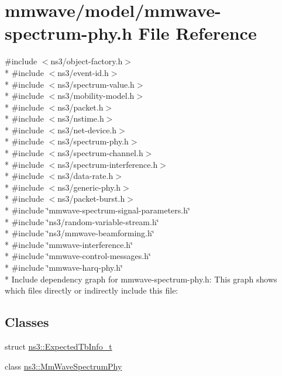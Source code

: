 \hypertarget{mmwave-spectrum-phy_8h}{}\section{mmwave/model/mmwave-\/spectrum-\/phy.h File Reference}
\label{mmwave-spectrum-phy_8h}
{\ttfamily \#include $<$ns3/object-\/factory.\+h$>$}\\*
{\ttfamily \#include $<$ns3/event-\/id.\+h$>$}\\*
{\ttfamily \#include $<$ns3/spectrum-\/value.\+h$>$}\\*
{\ttfamily \#include $<$ns3/mobility-\/model.\+h$>$}\\*
{\ttfamily \#include $<$ns3/packet.\+h$>$}\\*
{\ttfamily \#include $<$ns3/nstime.\+h$>$}\\*
{\ttfamily \#include $<$ns3/net-\/device.\+h$>$}\\*
{\ttfamily \#include $<$ns3/spectrum-\/phy.\+h$>$}\\*
{\ttfamily \#include $<$ns3/spectrum-\/channel.\+h$>$}\\*
{\ttfamily \#include $<$ns3/spectrum-\/interference.\+h$>$}\\*
{\ttfamily \#include $<$ns3/data-\/rate.\+h$>$}\\*
{\ttfamily \#include $<$ns3/generic-\/phy.\+h$>$}\\*
{\ttfamily \#include $<$ns3/packet-\/burst.\+h$>$}\\*
{\ttfamily \#include \char`\"{}mmwave-\/spectrum-\/signal-\/parameters.\+h\char`\"{}}\\*
{\ttfamily \#include \char`\"{}ns3/random-\/variable-\/stream.\+h\char`\"{}}\\*
{\ttfamily \#include \char`\"{}ns3/mmwave-\/beamforming.\+h\char`\"{}}\\*
{\ttfamily \#include \char`\"{}mmwave-\/interference.\+h\char`\"{}}\\*
{\ttfamily \#include \char`\"{}mmwave-\/control-\/messages.\+h\char`\"{}}\\*
{\ttfamily \#include \char`\"{}mmwave-\/harq-\/phy.\+h\char`\"{}}\\*
Include dependency graph for mmwave-\/spectrum-\/phy.h\+:
This graph shows which files directly or indirectly include this file\+:
\subsection*{Classes}
\begin{DoxyCompactItemize}
\item 
struct \hyperlink{structns3_1_1ExpectedTbInfo__t}{ns3\+::\+Expected\+Tb\+Info\+\_\+t}
\item 
class \hyperlink{classns3_1_1MmWaveSpectrumPhy}{ns3\+::\+Mm\+Wave\+Spectrum\+Phy}
\end{DoxyCompactItemize}
